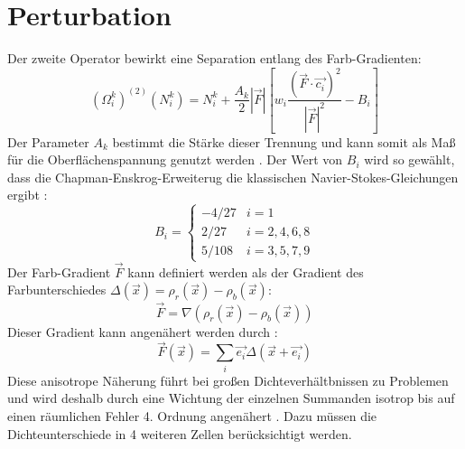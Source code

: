 \documentclass[a4paper,10pt]{scrreprt}
\begin{document}
\section{Perturbation}
Der zweite Operator bewirkt eine Separation entlang des Farb-Gradienten:
\begin{equation}
 (\Omega_i^k)^{(2)} (N_i^k) = N_i^k + \frac{A_k}{2} \left| \vec{F} \right| \left[w_i \frac{(\vec{F} \cdot \vec{c_i})^2 }{\left| \vec{F} \right|^2} -B_i  \right]
\end{equation}
Der Parameter $A_k$ bestimmt die Stärke dieser Trennung und kann somit als Maß für die Oberflächenspannung genutzt werden \cite{Gunstensen1991}. Der Wert von $B_i$ wird so gewählt, dass die Chapman-Enskrog-Erweiterug die klassischen Navier-Stokes-Gleichungen ergibt \cite{Reis2007}:
\begin{equation}
 B_i = \left\lbrace 
\begin{array}{ll}
- 4/27 & i = 1 \\
2/27 & i = 2,4,6,8 \\
5/108 & i= 3,5,7,9
\end{array} \right.
\end{equation}
Der Farb-Gradient $\vec{F}$ kann definiert werden als der Gradient des Farbunterschiedes $\Delta(\vec{x}) = \rho_r(\vec{x}) - \rho_b(\vec{x})$:
\begin{equation}
 \vec{F} = \nabla (\rho_r(\vec{x}) - \rho_b(\vec{x}))
\end{equation}
Dieser Gradient kann angenähert werden durch \cite{Grunau1993,Reis2007}:
\begin{equation}
 \vec{F}(\vec{x}) = \sum_i \vec{e_i} \Delta(\vec{x} + \vec{e_i}) 
\end{equation}
Diese anisotrope Näherung führt bei großen Dichteverhältbnissen zu Problemen und wird deshalb durch eine Wichtung der einzelnen Summanden isotrop bis auf einen räumlichen Fehler 4. Ordnung angenähert \cite{Leclaire2011}.
Dazu müssen die Dichteunterschiede in 4 weiteren Zellen berücksichtigt werden.
\end{document}

